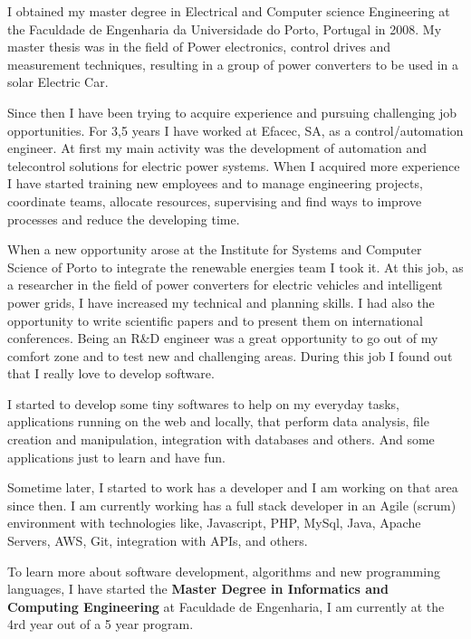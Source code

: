 \documentclass[letterpaper,11pt]{article}
\newlength{\outerbordwidth}
\newcommand{\resheading}[1]{\vspace{4pt}
  \parbox{\textwidth}{\setlength{\FrameSep}{\outerbordwidth}
    \begin{shaded}
\setlength{\fboxsep}{0pt}\framebox[\textwidth][l]{\setlength{\fboxsep}{4pt}\fcolorbox{shadecolorB}{shadecolorB}{\textbf{\sffamily{\mbox{~}\makebox[6.762in][l]{\large #1} \vphantom{p\^{E}}}}}}
    \end{shaded}
  }\vspace{4pt}
}
\newcommand{\cvevent}[1]{\vspace{5pt}
  \parbox{\textwidth}{\setlength{\FrameSep}{\outerbordwidth}
    \begin{shaded}
        \setlength{\fboxsep}{0pt}{\setlength{\fboxsep}{4pt}\fcolorbox{sectcol}{sectcol}{\textbf{\sffamily{\mbox{~}\makebox[6.762in][l]{\textcolor{white}{\large \uppercase{#1}}} \vphantom{p\^{E}}}}}}
    \end{shaded}
  }\vspace{40pt}
}
\begin{document}
\vspace{0.2in}		%


\resheading{\faUser\hspace{4pt}Summary}
\begin{center}
	\parbox{6.762in}{I obtained my master degree in Electrical and Computer science Engineering at the Faculdade de Engenharia da Universidade do Porto, Portugal in 2008. My master thesis was in the field of Power electronics, control drives and measurement techniques, resulting in a group of power converters to be used in a solar Electric Car. %
	
	Since then I have been trying to acquire experience and pursuing challenging job opportunities. For 3,5 years I have worked at Efacec, SA, as a control/automation engineer. At first my main activity was the development of automation and telecontrol solutions for electric power systems. When I acquired more experience I have started training new employees and to manage engineering projects, coordinate teams, allocate resources, supervising and find ways to improve processes and reduce the developing time.
	
	When a new opportunity arose at the Institute for Systems and Computer Science of Porto to integrate the renewable energies team I took it. At this job, as a researcher in the field of power converters for electric vehicles and intelligent power grids, I have increased my technical and planning skills. I had also the opportunity to write scientific papers and to present them on international conferences. Being an R\&D engineer was a great opportunity to go out of my comfort zone and to test new and challenging areas. During this job I found out that I really love to develop software.
	
	I started to develop some tiny softwares to help on my everyday tasks, applications running on the web and locally, that perform data analysis, file creation and manipulation, integration with databases and others. And some applications just to learn and have fun.
	
	Sometime later, I started to work has a developer and I am working on that area since then. I am currently working has a full stack developer in an Agile (scrum) environment with technologies like, Javascript, PHP, MySql, Java, Apache Servers, AWS, Git, integration with APIs, and others.
	
	To learn more about software development, algorithms and new programming languages, I have started the \textbf{Master Degree in Informatics and Computing Engineering} at Faculdade de Engenharia, I am currently at the 4rd year out of a 5 year program. }
\end{center}
\end{document}

